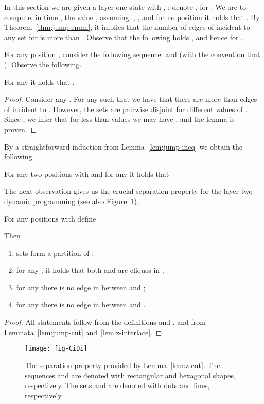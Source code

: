 In this section we are given a layer-one state  with , ;
denote ,  for .
We are to compute, in time , the value , assuming: , , and
for no position  it holds that . By Theorem~\ref{thm:jump-enum}, it implies that the number of edges of 
incident to any set  for  is more than . Observe that the following holds  , and hence  for . 

For any position , consider the following sequence:  and  (with the convention that ).
Observe the following.
\begin{lemma}\label{lem:short-z}
For any  it holds that .
\end{lemma}
\begin{proof}
Consider any . For any  such that  we have
that there are more than  edges of  incident to .
However, the sets  are pairwise disjoint for different values of .
Since , we infer that for less than  values  we may have , and the lemma is proven.
\end{proof}

By a straightforward induction from Lemma~\ref{lem:jump-ineq} we obtain the following.
\begin{lemma}\label{lem:z-interlace}
For any two positions  with 
and for any  it holds that

\end{lemma}
The next observation gives us the crucial separation property for the layer-two dynamic programming (see also Figure~\ref{fig:CiDi}).
\begin{lemma}\label{lem:z-cut}
For any positions  with 
define

Then
\begin{enumerate}
\item sets  form a partition of ;
\item for any , it holds that both  and 
are cliques in ;
\item for any  there is no edge in  between  and ;
\item for any  there is no edge in  between  and .
\end{enumerate}
\end{lemma}
\begin{proof}
All statements follow from the definitions 
and , and from Lemmata~\ref{lem:jump-cut} and~\ref{lem:z-interlace}.
\end{proof}

\begin{figure}
\centering
\texttt{[image: fig-CiDi]}
\caption{The separation property provided by Lemma~\ref{lem:z-cut}.
The sequences  and  are denoted with rectangular and hexagonal shapes, respectively.
The sets  and  are denoted with dots and lines, respectively.}
\label{fig:CiDi}
\end{figure}


